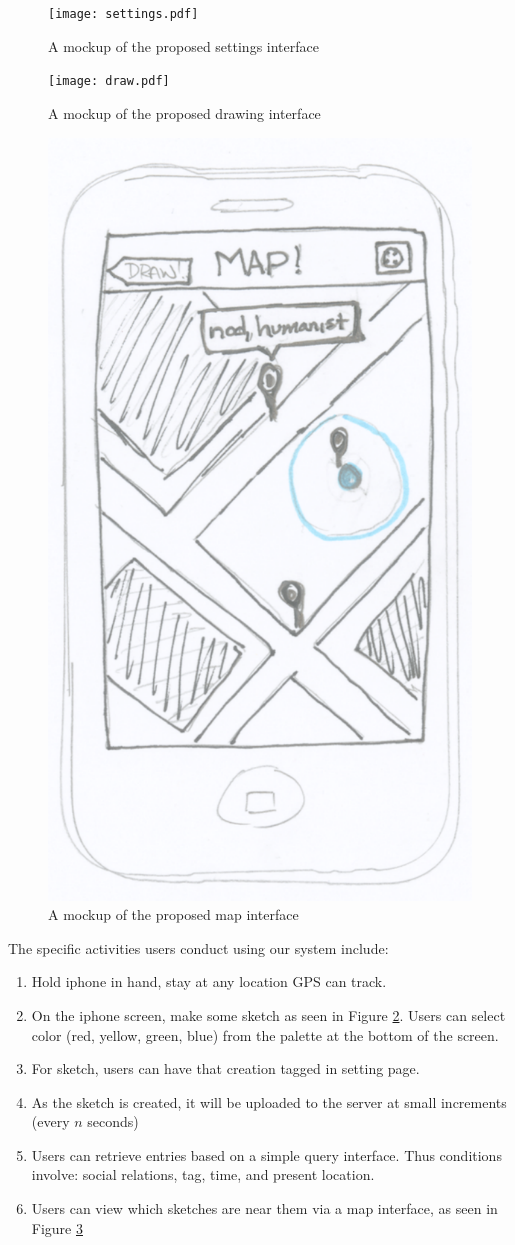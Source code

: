 \documentclass{chi2009}
\begin{document}
\begin{figure}
\centering
\texttt{[image: settings.pdf]}
\caption{A mockup of the proposed settings interface}
\label{fig:settings}
\end{figure}

\begin{figure}
\centering
\texttt{[image: draw.pdf]}
\caption{A mockup of the proposed drawing interface}
\label{fig:draw}
\end{figure}

\begin{figure}
\centering
\includegraphics[width=.3\textwidth]{map.pdf}
\caption{A mockup of the proposed map interface}
\label{fig:map}
\end{figure}

The specific activities users conduct using our system include:
\begin{enumerate}
\item Hold iphone in hand, stay at any location GPS can track.
\item On the iphone screen, make some sketch as seen in Figure \ref{fig:draw}. Users can select color (red, yellow, green, blue) from the palette at the bottom of the screen.
\item For sketch, users can have that creation tagged in setting page.
\item As the sketch is created, it will be uploaded to the server at small
	increments (every $n$ seconds)
\item Users can retrieve entries based on a simple query interface. Thus
	conditions involve: social relations, tag, time, and present location.
\item Users can view which sketches are near them via a map interface, as seen
	in Figure \ref{fig:map}
\end{enumerate}
\end{document}
